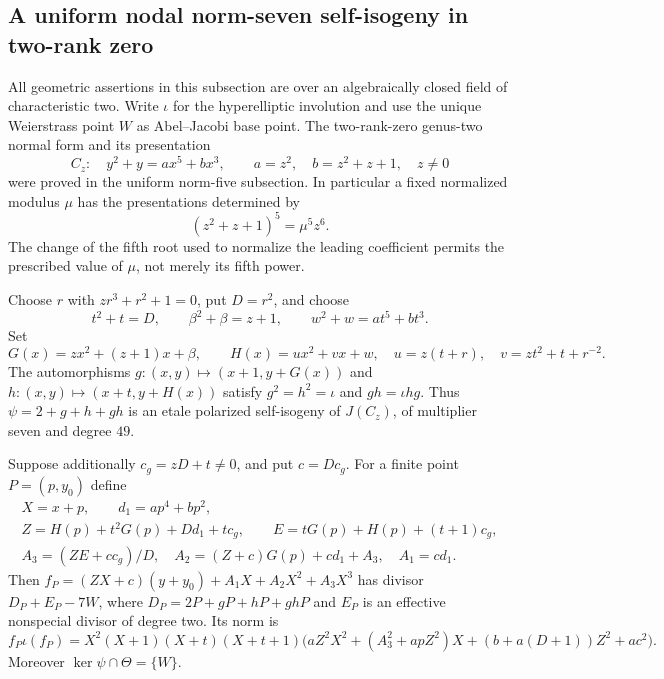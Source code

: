 \subsection{A uniform nodal norm-seven self-isogeny in two-rank zero}
\label{subsec:uniform-seven-theta-candidate}

All geometric assertions in this subsection are over an algebraically
closed field of characteristic two. Write $\iota$ for the hyperelliptic
involution and use the unique Weierstrass point $W$ as Abel--Jacobi base
point. The two-rank-zero genus-two normal form and its presentation
\[
 C_z:\quad y^2+y=ax^5+bx^3,\qquad
 a=z^2,\quad b=z^2+z+1,\quad z\ne0
 \tag{S7.1}
\]
were proved in the uniform norm-five subsection. In particular a fixed
normalized modulus $\mu$ has the presentations determined by
\[
             (z^2+z+1)^5=\mu^5z^6.                \tag{S7.2}
\]
The change of the fifth root used to normalize the leading coefficient
permits the prescribed value of $\mu$, not merely its fifth power.

\begin{lemma}
\label{lem:uniform-seven-interpolation-candidate}
Choose $r$ with $zr^3+r^2+1=0$, put $D=r^2$, and choose
\[
 t^2+t=D,\qquad \beta^2+\beta=z+1,\qquad
 w^2+w=at^5+bt^3.
\]
Set
\[
 G(x)=zx^2+(z+1)x+\beta,\qquad
 H(x)=ux^2+vx+w,
 \quad u=z(t+r),\quad v=zt^2+t+r^{-2}.
\]
The automorphisms $g:(x,y)\mapsto(x+1,y+G(x))$ and
$h:(x,y)\mapsto(x+t,y+H(x))$ satisfy
$g^2=h^2=\iota$ and $gh=\iota hg$.
Thus $\psi=2+g+h+gh$ is an etale polarized self-isogeny of
$J(C_z)$, of multiplier seven and degree $49$.

Suppose additionally $c_g=zD+t\ne0$, and put $c=Dc_g$.
For a finite point $P=(p,y_0)$ define
\[
\begin{gathered}
 X=x+p,\qquad d_1=ap^4+bp^2,\\
 Z=H(p)+t^2G(p)+Dd_1+tc_g,\qquad
 E=tG(p)+H(p)+(t+1)c_g,\\
 A_3=(ZE+cc_g)/D,\quad
 A_2=(Z+c)G(p)+cd_1+A_3,\quad A_1=cd_1.
\end{gathered}
\]
Then $f_P=(ZX+c)(y+y_0)+A_1X+A_2X^2+A_3X^3$ has divisor
$D_P+E_P-7W$, where $D_P=2P+gP+hP+ghP$ and $E_P$ is an
effective nonspecial divisor of degree two. Its norm is
\[
 f_P\iota(f_P)=X^2(X+1)(X+t)(X+t+1)
 \bigl(aZ^2X^2+(A_3^2+apZ^2)X
              +(b+a(D+1))Z^2+ac^2\bigr).          \tag{S7.3}
\]
Moreover $\ker\psi\cap\Theta=\{W\}$.
\end{lemma}

